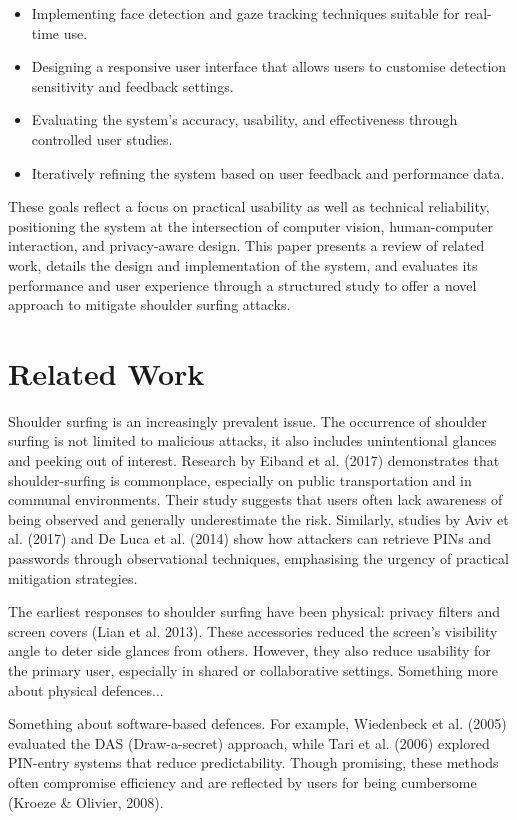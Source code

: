\documentclass[12pt]{article}
\theoremstyle{plain}
\theoremstyle{definition}
\begin{document}
\begin{itemize}
  \item Implementing face detection and gaze tracking techniques suitable for real-time use.
  \item Designing a responsive user interface that allows users to customise detection sensitivity and feedback settings.
  \item Evaluating the system’s accuracy, usability, and effectiveness through controlled user studies.
  \item Iteratively refining the system based on user feedback and performance data.
\end{itemize}

These goals reflect a focus on practical usability as well as technical reliability, positioning the system at the intersection of computer vision, human-computer interaction, and privacy-aware design. This paper presents a review of related work, details the design and implementation of the system, and evaluates its performance and user experience through a structured study to offer a novel approach to mitigate shoulder surfing attacks.

\section{Related Work}
\label{sec:Related Work} 

Shoulder surfing is an increasingly prevalent issue. The occurrence of shoulder surfing is not limited to malicious attacks, it also includes unintentional glances and peeking out of interest. Research by Eiband et al. (2017) demonstrates that shoulder-surfing is commonplace, especially on public transportation and in communal environments. Their study suggests that users often lack awareness of being observed and generally underestimate the risk. Similarly, studies by Aviv et al. (2017) and De Luca et al. (2014) show how attackers can retrieve PINs and passwords through observational techniques, emphasising the urgency of practical mitigation strategies.

The earliest responses to shoulder surfing have been physical: privacy filters and screen covers (Lian et al. 2013). These accessories reduced the screen’s visibility angle to deter side glances from others. However, they also reduce usability for the primary user, especially in shared or collaborative settings. Something more about physical defences... 

Something about software-based defences. For example, Wiedenbeck et al. (2005) evaluated the DAS (Draw-a-secret) approach, while Tari et al. (2006) explored PIN-entry systems that reduce predictability. Though promising, these methods often compromise efficiency and are reflected by users for being cumbersome (Kroeze & Olivier, 2008).
\end{document}
